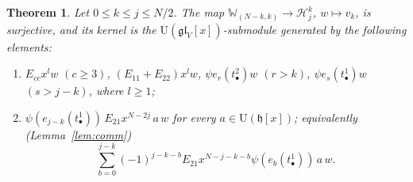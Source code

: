 \documentclass[11pt]{amsart}
\numberwithin{equation}{section}
\newtheorem{theorem}[equation]{Theorem}
\theoremstyle{definition}
\newcommand{\gl}{\mathfrak{gl}}
\newcommand{\fh}{\mathfrak{h}}
\newcommand{\U}{\mathrm{U}}
\newcommand{\bW}{\mathbb{W}}          %
\begin{document}
	\begin{theorem}\label{thm:presentation}
		Let $0\le k\le j\le N/2$. The map $\bW_{(N-k,k)}\to\mathcal H_j^k$, $w\mapsto v_k$, is surjective, and its kernel is the $\U(\gl_V[x])$-submodule generated by the following elements:
		\begin{enumerate}[label=\textup{$(\mathrm{R}\arabic*_j)$}]
			\item \label{R1}  $E_{cc}x^l w$ $(c \geq 3)$, $(E_{11}+E_{22})x^l  w$, $\psi e_r(t^2_{\bullet})w$ $(r>k)$, $\psi e_s(t^1_{\bullet})w$ $(s>j-k)$, where $l\ge1$;
			\item   \label{R2}  $\psi (e_{j-k}(t^1_\bullet))\,E_{21}x^{N-2j}\,a\,w$ for every $a\in\U(\fh[x])$; equivalently (Lemma~\ref{lem:comm})
			\[
			\sum_{b=0}^{j-k}(-1)^{j-k-b}E_{21}x^{N-j-k-b}\psi (e_{b}(t^1_\bullet))\,a\,w .
			\]
		\end{enumerate}
	\end{theorem}
\end{document}

